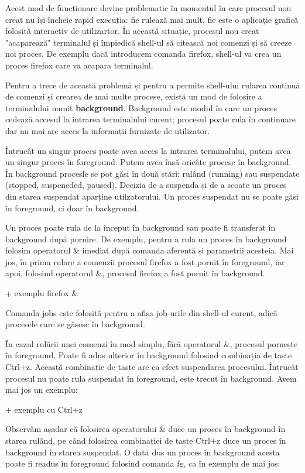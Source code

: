 Acest mod de funcționare devine problematic în momentul în care procesul nou
creat nu își încheie rapid execuția: fie rulează mai mult, fie este o aplicație
grafică folosită interactiv de utilizartor. În această situație, procesul nou
creat "acaparează" terminalul și împiedică shell-ul să citească noi comenzi și
să creeze noi proces. De exemplu dacă introducem comanda firefox, shell-ul va
crea un proces firefox care va acapara terminalul.

Pentru a trece de această problemă și pentru a permite shell-ului rularea
continuă de comenzi și crearea de mai multe procese, există un mod de folosire a
terminalului numit \textbf{background}. Background este modul în care un proces cedează
accesul la intrarea terminalului curent; procesul poate rula în continuare dar
nu mai are acces la informații furnizate de utilizator.

Întrucât un singur proces poate avea acces la intrarea terminalului, putem avea
un singur proces în foreground. Putem avea însă oricâte procese în background.
În background procesle se pot găsi în două stări: rulând (running) sau
suspendate (stopped, suspeneded, paused). Decizia de a suspenda și de a scoate
un proces din starea suspendat aparține utilzatorului. Un proces suspendat nu se
poate găsi în foreground, ci doar în background.

Un proces poate rula de la început în background sau poate fi transferat în
background după pornire. De exemplu, pentru a rula un proces în background
folosim operatorul \& imediat după comanda aferentă și parametrii acesteia. Mai
jos, în prima rulare a comenzii procesul firefox a fost pornit în foreground,
iar apoi, folosind operatorul \&, procesul firefox a fost pornit în background.

+ exemplu firefox \&

Comanda jobs este folosită pentru a afișa job-urile din shell-ul curent, adică
procesele care se găsesc în background.

În cazul rulării unei comenzi în mod simplu, fără operatorul \&, procesul
pornește în foreground. Poate fi adus ulterior în background folosind combinația
de taste Ctrl+z. Această combinație de taste are ca efect suspendarea
procesului. Întrucât procesul nu poate rula suspendat în foreground, este trecut
în background. Avem mai jos un exemplu:

+ exemplu cu Ctrl+z

Observăm așadar că folosirea operatorului \& duce un proces în background în
starea rulând, pe când folosirea combinației de taste Ctrl+z duce un proces în
background în starea suspendat. O dată dus un proces în background acesta poate
fi readus în foreground folosind comanda fg, ca în exemplu de mai jos:

